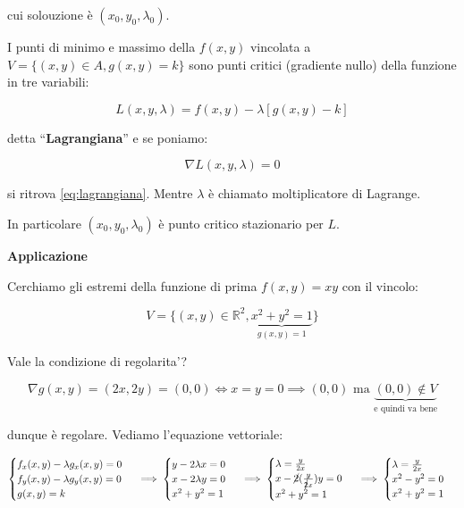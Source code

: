 \documentclass[../appunti-analisi.tex]{subfiles}
\begin{document}
cui solouzione è $(x_0,y_0,\lambda_0)$. 

I punti di minimo e massimo della $f(x,y)$ vincolata a $V= \{(x,y) \in A, g(x,y) = k\}$ sono punti critici (gradiente nullo) della funzione in tre variabili:

\[
    L(x,y,\lambda) = f(x,y) - \lambda [g(x,y) -k]
\]

detta ``\textbf{Lagrangiana}'' e se poniamo:

\[
    \nabla L(x,y,\lambda) = 0
\]

si ritrova \ref{eq:lagrangiana}. Mentre $\lambda$ è chiamato moltiplicatore di Lagrange.

In particolare $(x_0,y_0, \lambda_0)$ è punto critico stazionario per $L$.

\newpage

\textbf{Applicazione} 

Cerchiamo gli estremi della funzione di prima $f(x,y) = xy$ con il vincolo:

\[
    V= \{(x,y) \in \mathbb{R}^{2}, \underbrace{x^{2}+y^{2} = 1}_\text{$g(x,y) = 1$}\}
\]

Vale la condizione di regolarita'?

\[
    \nabla g(x,y) = (2x,2y) = (0,0) \Leftrightarrow x=y=0 \implies (0,0) \text{ ma } \underbrace{(0,0) \notin V}_\text{e quindi va bene}
\]

dunque è regolare. Vediamo l'equazione vettoriale:

\[
        \begin{cases}
               f_x(x,y) - \lambda g_x(x,y) = 0\\
               f_y(x,y) - \lambda g_y(x,y) = 0\\
               g(x,y) = k
        \end{cases}\, \implies
        \begin{cases}
               y -2 \lambda x= 0\\
               x -2 \lambda y = 0\\
               x^{2}+ y^{2}= 1
        \end{cases}\, \implies
        \begin{cases}
               \lambda= \frac{y}{2x}\\
               x-\cancel{2}( \frac{y}{\cancel{2}x})y= 0\\
               x^{2}+ y^{2}= 1
        \end{cases}\, \implies
        \begin{cases}
               \lambda= \frac{y}{2x}\\
               x^{2}-y^{2}= 0\\
               x^{2}+ y^{2}= 1
        \end{cases}\, 
\]
\end{document}
